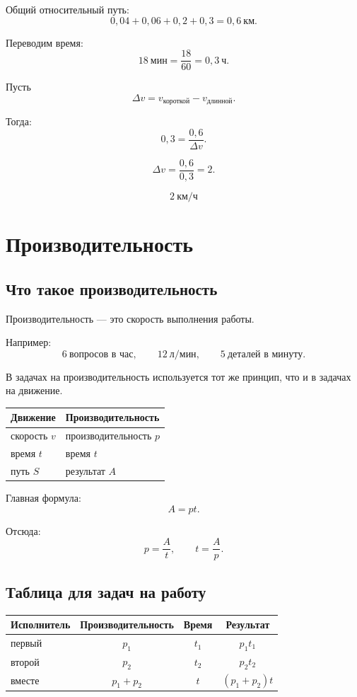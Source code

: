 \documentclass[a4paper,12pt]{article}
\newcommand{\kmh}{\text{км/ч}}
\newcommand{\km}{\text{км}}
\newcommand{\ch}{\text{ч}}
\newcommand{\minut}{\text{мин}}
\newcommand{\lpm}{\text{л/мин}}
\begin{document}
Общий относительный путь:
\[
0{,}04+0{,}06+0{,}2+0{,}3=0{,}6\ \km.
\]

Переводим время:
\[
18\ \minut=\frac{18}{60}=0{,}3\ \ch.
\]

Пусть
\[
\Delta v=v_{\text{короткой}}-v_{\text{длинной}}.
\]

Тогда:
\[
0{,}3=\frac{0{,}6}{\Delta v}.
\]

\[
\Delta v=\frac{0{,}6}{0{,}3}=2.
\]

\[
\boxed{2\ \kmh}
\]

\section{Производительность}

\subsection{Что такое производительность}

Производительность --- это скорость выполнения работы.

Например:
\[
6\ \text{вопросов в час}, \qquad
12\ \lpm, \qquad
5\ \text{деталей в минуту}.
\]

В задачах на производительность используется тот же принцип, что и в задачах на движение.

\begin{center}
\renewcommand{\arraystretch}{1.35}
\begin{tabularx}{0.86\linewidth}{X X}
\toprule
\textbf{Движение} & \textbf{Производительность} \\
\midrule
скорость $v$ & производительность $p$ \\
время $t$ & время $t$ \\
путь $S$ & результат $A$ \\
\bottomrule
\end{tabularx}
\end{center}

Главная формула:
\[
A=pt.
\]

Отсюда:
\[
p=\frac{A}{t}, \qquad t=\frac{A}{p}.
\]

\subsection{Таблица для задач на работу}

\begin{center}
\renewcommand{\arraystretch}{1.35}
\begin{tabularx}{0.9\linewidth}{X c c c}
\toprule
\textbf{Исполнитель} & \textbf{Производительность} & \textbf{Время} & \textbf{Результат} \\
\midrule
первый & $p_1$ & $t_1$ & $p_1t_1$ \\
второй & $p_2$ & $t_2$ & $p_2t_2$ \\
вместе & $p_1+p_2$ & $t$ & $(p_1+p_2)t$ \\
\bottomrule
\end{tabularx}
\end{center}
\end{document}
